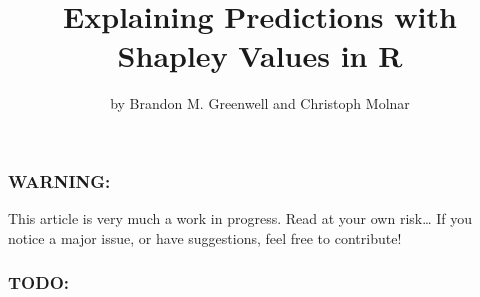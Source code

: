 \title{Explaining Predictions with Shapley Values in R}
\author{by Brandon M. Greenwell and Christoph Molnar}

\maketitle


\hypertarget{warning}{%
\subsubsection{WARNING:}\label{warning}}

This article is very much a work in progress. Read at your own
risk\ldots{} If you notice a major issue, or have suggestions, feel free
to contribute!

\hypertarget{todo}{%
\subsubsection{TODO:}\label{todo}}

